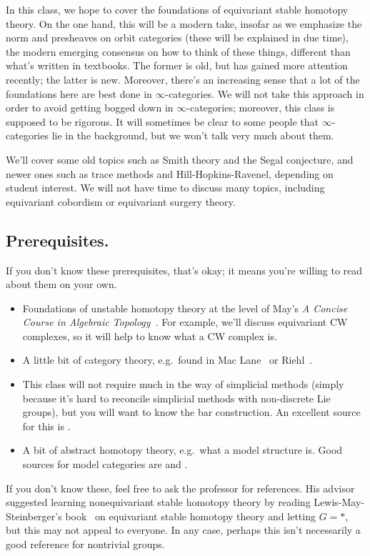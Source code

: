 In this class, we hope to cover the foundations of equivariant stable homotopy theory. On the one hand, this will
be a modern take, insofar as we emphasize the norm and presheaves on orbit categories (these will be explained in
due time), the modern emerging consensus on how to think of these things, different than what's written in
textbooks. The former is old, but has gained more attention recently; the latter is new. Moreover, there's an
increasing sense that a lot of the foundations here are best done in $\infty$-categories. We will not take this
approach in order to avoid getting bogged down in $\infty$-categories; moreover, this class is supposed to be
rigorous. It will sometimes be clear to some people that $\infty$-categories lie in the background, but we won't
talk very much about them.

We'll cover some old topics such as Smith theory and the Segal conjecture, and newer ones such as trace methods
and Hill-Hopkins-Ravenel, depending on student interest. We will not have time to discuss many topics, including
equivariant cobordism or equivariant surgery theory.
\subsection*{Prerequisites.} If you don't know these prerequisites, that's okay; it means you're willing to read
about them on your own.
\begin{itemize}
	\item Foundations of unstable homotopy theory at the level of May's \textit{A Concise Course in Algebraic
	Topology}~\cite{ConciseCourse}. For example, we'll discuss equivariant CW complexes, so it will help to know
	what a CW complex is.
	\item A little bit of category theory, e.g.\ found in Mac Lane~\cite{MacLane} or Riehl~\cite{RiehlCTC}.
	\item This class will not require much in the way of simplicial methods (simply because it's hard to reconcile
	simplicial methods with non-discrete Lie groups), but you will want to know the bar construction. An excellent source for this is \cite[Chapter 4]{RiehlCHT}.
	\item A bit of abstract homotopy theory, e.g.\ what a model structure is. Good sources for model categories are \cite[Part III]{RiehlCHT} and \cite{Hovey}.
\end{itemize}
If you don't know these, feel free to ask the professor for references. His advisor suggested learning
nonequivariant stable homotopy theory by reading Lewis-May-Steinberger's book~\cite{LMS} on equivariant stable
homotopy theory and letting $G = *$, but this may not appeal to everyone. In any case, perhaps this isn't
necessarily a good reference for nontrivial groups.

